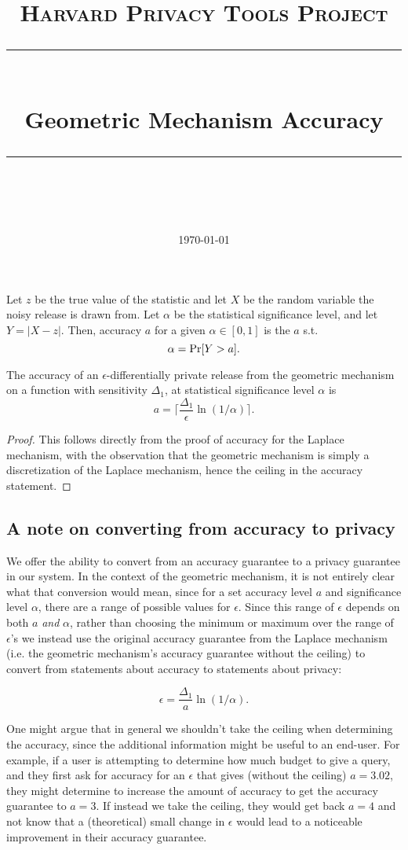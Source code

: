 \documentclass[11pt]{scrartcl} %
\title{
	\normalfont\normalsize
	\textsc{Harvard Privacy Tools Project}\\ %
	\vspace{25pt} %
	\rule{\linewidth}{0.5pt}\\ %
	\vspace{20pt} %
	{\huge Geometric Mechanism Accuracy}\\ %
	\vspace{12pt} %
	\rule{\linewidth}{2pt}\\ %
	\vspace{12pt} %
}
\date{\normalsize\today} %
\begin{document}
\maketitle

\begin{definition}
Let $z$ be the true value of the statistic and let $X$ be the random variable the noisy release is drawn from. Let $\alpha$ be the statistical significance level, and let $Y = \vert X-z \vert.$ Then, accuracy $a$ for a given $\alpha \in [0,1]$ is the $a$ s.t.
$$ \alpha = \text{Pr}[Y > a].$$
\end{definition}

\begin{theorem}
The accuracy of an $\epsilon$-differentially private release from the geometric mechanism on a function with sensitivity $\Delta_1$, at statistical significance level $\alpha$ is
$$ a = \lceil \frac{\Delta_1}{\epsilon}\ln(1/\alpha) \rceil.$$
\end{theorem}\cite{balcer2017differential, ghosh2012universally}

\begin{proof}
This follows directly from the proof of accuracy for the Laplace mechanism, with the observation that the geometric mechanism is simply a discretization of the Laplace mechanism, hence the ceiling in the accuracy statement.
\end{proof}

\subsection{A note on converting from accuracy to privacy}

We offer the ability to convert from an accuracy guarantee to a privacy guarantee in our system. In the context of the geometric mechanism, it is not entirely clear what that conversion would mean, since for a set accuracy level $a$ and significance level $\alpha$, there are a range of possible values for $\epsilon$. Since this range of $\epsilon$ depends on both $a$ \textit{and} $\alpha$, rather than choosing the minimum or maximum over the range of $\epsilon$'s we instead use the original accuracy guarantee from the Laplace mechanism (i.e. the geometric mechanism's accuracy guarantee without the ceiling) to convert from statements about accuracy to statements about privacy:

$$ \epsilon = \frac{\Delta_1}{a}\ln(1/\alpha).$$

One might argue that in general we shouldn't take the ceiling when determining the accuracy, since the additional information might be useful to an end-user. For example, if a user is attempting to determine how much budget to give a query, and they first ask for accuracy for an $\epsilon$ that gives (without the ceiling) $a = 3.02$, they might determine to increase the amount of accuracy to get the accuracy guarantee to $a = 3$. If instead we take the ceiling, they would get back $a = 4$ and not know that a (theoretical) small change in $\epsilon$ would lead to a noticeable improvement in their accuracy guarantee. 



\end{document}
